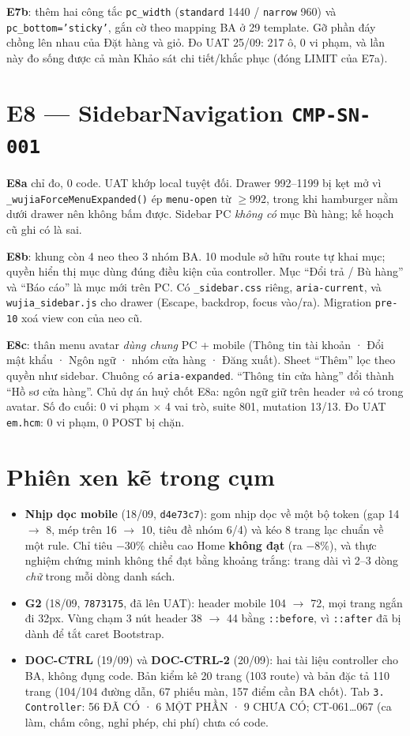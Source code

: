 \textbf{E7b}: thêm hai công tắc \texttt{pc\_width} (\texttt{standard} 1440 / \texttt{narrow} 960) và
\texttt{pc\_bottom='sticky'}, gắn cờ theo mapping BA ở 29 template. Gỡ phần đáy chồng lên nhau của Đặt
hàng và giỏ. Đo UAT 25/09: 217 ô, 0 vi phạm, và lần này đo sống được cả màn Khảo sát chi tiết/khắc phục
(đóng LIMIT của E7a).

\section{E8 --- SidebarNavigation \texttt{CMP-SN-001}}

\textbf{E8a} chỉ đo, 0 code. UAT khớp local tuyệt đối. Drawer 992--1199 bị kẹt mở vì
\texttt{\_wujiaForceMenuExpanded()} ép \texttt{menu-open} từ $\geq$992, trong khi hamburger nằm dưới drawer
nên không bấm được. Sidebar PC \emph{không có} mục Bù hàng; kế hoạch cũ ghi có là sai.

\textbf{E8b}: khung còn 4 neo theo 3 nhóm BA. 10 module sở hữu route tự khai mục; quyền hiển thị mục
dùng đúng điều kiện của controller. Mục ``Đổi trả / Bù hàng'' và ``Báo cáo'' là mục mới trên PC. Có
\texttt{\_sidebar.css} riêng, \texttt{aria-current}, và \texttt{wujia\_sidebar.js} cho drawer (Escape,
backdrop, focus vào/ra). Migration \texttt{pre-10} xoá view con của neo cũ.

\textbf{E8c}: thân menu avatar \emph{dùng chung} PC + mobile (Thông tin tài khoản · Đổi mật khẩu · Ngôn ngữ ·
nhóm cửa hàng · Đăng xuất). Sheet ``Thêm'' lọc theo quyền như sidebar. Chuông có \texttt{aria-expanded}.
``Thông tin cửa hàng'' đổi thành ``Hồ sơ cửa hàng''. Chủ dự án huỷ chốt E8a: ngôn ngữ giữ trên header
\emph{và} có trong avatar. Số đo cuối: 0 vi phạm × 4 vai trò, suite 801, mutation 13/13. Đo UAT
\texttt{em.hcm}: 0 vi phạm, 0 POST bị chặn.

\section{Phiên xen kẽ trong cụm}

\begin{itemize}
\item \textbf{Nhịp dọc mobile} (18/09, \texttt{d4e73c7}): gom nhịp dọc về một bộ token (gap 14 $\to$ 8,
  mép trên 16 $\to$ 10, tiêu đề nhóm 6/4) và kéo 8 trang lạc chuẩn về một rule. Chỉ tiêu $-$30\% chiều cao
  Home \textbf{không đạt} (ra $-$8\%), và thực nghiệm chứng minh không thể đạt bằng khoảng trắng: trang dài
  vì 2--3 dòng \emph{chữ} trong mỗi dòng danh sách.
\item \textbf{G2} (18/09, \texttt{7873175}, đã lên UAT): header mobile 104 $\to$ 72, mọi trang ngắn đi 32px.
  Vùng chạm 3 nút header 38 $\to$ 44 bằng \texttt{::before}, vì \texttt{::after} đã bị dành để tắt caret Bootstrap.
\item \textbf{DOC-CTRL} (19/09) và \textbf{DOC-CTRL-2} (20/09): hai tài liệu controller cho BA, không đụng code.
  Bản kiểm kê 20 trang (103 route) và bản đặc tả 110 trang (104/104 đường dẫn, 67 phiếu màn, 157 điểm cần
  BA chốt). Tab \texttt{3. Controller}: 56 ĐÃ CÓ · 6 MỘT PHẦN · 9 CHƯA CÓ; CT-061…067 (ca làm, chấm công,
  nghỉ phép, chi phí) chưa có code.
\end{itemize}

